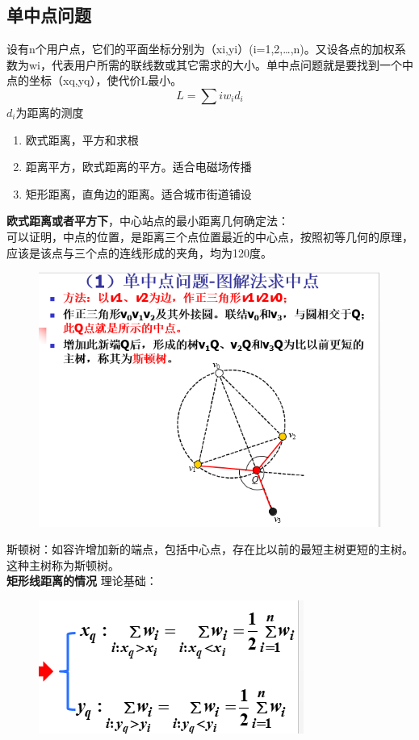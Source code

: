 \subsection{单中点问题
}
设有n个用户点，它们的平面坐标分别为（xi,yi）(i=1,2,…,n)。又设各点的加权系数为wi，代表用户所需的联线数或其它需求的大小。单中点问题就是要找到一个中点的坐标（xq,yq），使代价L最小。
\begin{equation}\label{key}
L = \sum{i}{} w_id_i
\end{equation}
$ d_i $为距离的测度
\begin{enumerate}
	\item 欧式距离，平方和求根
	\item 距离平方，欧式距离的平方。适合电磁场传播
	\item 矩形距离，直角边的距离。适合城市街道铺设
\end{enumerate}
\textbf{欧式距离或者平方下}，中心站点的最小距离几何确定法：\\
可以证明，中点的位置，是距离三个点位置最近的中心点，按照初等几何的原理，应该是该点与三个点的连线形成的夹角，均为120度。
\begin{figure}[H]
	\centering
	\includegraphics[width=0.7\linewidth]{figures/screenshot077}
	\caption{}
	\label{fig:screenshot077}
\end{figure}
斯顿树：如容许增加新的端点，包括中心点，存在比以前的最短主树更短的主树。这种主树称为斯顿树。\\
\vspace{1pt}
\textbf{矩形线距离的情况}
理论基础：
\begin{figure}[H]
	\centering
	\includegraphics[width=0.7\linewidth]{figures/screenshot078}
	\caption{}
	\label{fig:screenshot078}
\end{figure}
